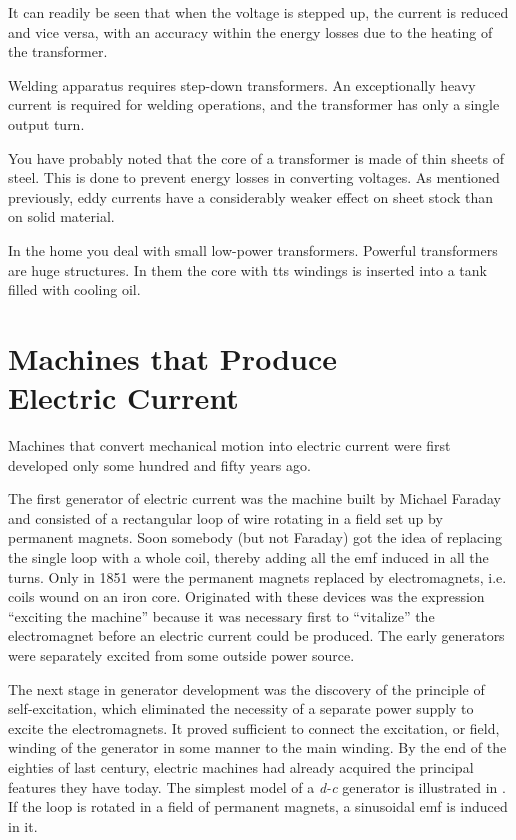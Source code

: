 It can readily be seen that when the voltage is stepped up, the current is reduced and vice versa, with an accuracy within the energy losses due to the heating of
the transformer.

Welding apparatus requires step-down transformers. An exceptionally heavy current is required for welding operations, and the transformer has only a single output turn.

You have probably noted that the core of a transformer is made of thin sheets of steel. This is done to prevent energy losses in converting voltages. As mentioned previously, eddy currents have a considerably weaker effect on sheet stock than on solid material.

In the home you deal with small low-power transformers. Powerful transformers are huge structures. In them the core with tts windings is inserted into a tank filled with cooling oil.

\section[Machines that Produce Electric Current]{Machines that Produce \\Electric Current}

Machines that convert mechanical motion into electric current were first developed only some hundred and fifty years ago.

The first generator of electric current was the machine built by Michael Faraday and consisted of a rectangular loop of wire rotating in a field set up by permanent magnets. Soon somebody (but not Faraday) got the idea of replacing the single loop with a whole coil, thereby adding all the emf induced in all the turns. Only in 1851 were the permanent magnets replaced by electromagnets, i.e. coils wound on an iron core. Originated with these devices was the expression ``exciting the machine'' because it was necessary first to ``vitalize'' the electromagnet before an electric current could be produced. The early generators were separately excited from some outside power source.

The next stage in generator development was the discovery of the principle of self-excitation, which eliminated the necessity of a separate power supply to excite the electromagnets. It proved sufficient to connect the excitation, or field, winding of the generator in some manner to the main winding. By the end of the eighties of last century, electric machines had already acquired the principal features they have today. The simplest model of a \emph{d-c} generator is illustrated in . If the loop is rotated in a field of permanent magnets, a sinusoidal emf is induced in it.

